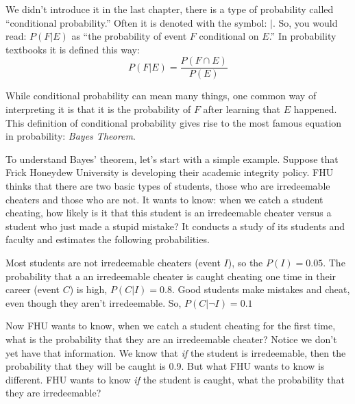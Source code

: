 We didn't introduce it in the last chapter,  there is a type of probability called ``conditional probability.''  Often it is denoted with the symbol: $|$.  So, you would read: $P(F | E)$ as ``the probability of event $F$ conditional on $E$.'' In probability textbooks it is defined this way:
\begin{equation}
    \label{e:conditional-prob}
    P(F | E) = \frac{P(F \cap E)}{P(E)}
\end{equation}


While conditional probability can mean many things, one common way of interpreting it is that it is the probability of $F$ after learning that $E$ happened.  This definition of conditional probability gives rise to the most famous equation in probability: {\it Bayes Theorem}. 

To understand Bayes' theorem, let's start with a simple example.  Suppose that Frick Honeydew University is developing their academic integrity policy.  FHU thinks that there are two basic types of students, those who are irredeemable cheaters and those who are not. It wants to know: when we catch a student cheating, how likely is it that this student is an irredeemable cheater versus a student who just made a stupid mistake?  It conducts a study of its students and faculty and estimates the following probabilities.

 Most students are not irredeemable cheaters (event $I$), so the $P(I) = 0.05$. The probability that a an irredeemable cheater is caught cheating one time in their career (event $C$) is high, $P(C|I) = 0.8$. Good students make mistakes and cheat, even though they aren't irredeemable.  So, $P(C|\neg I) = 0.1$


Now FHU wants to know, when we catch a student cheating for the first time, what is the probability that they are an irredeemable cheater?  Notice we don't yet have that information. We know that {\it if} the student is irredeemable, then the probability that they will be caught is 0.9.  But what FHU wants to know is different. FHU wants to know {\it if} the student is caught, what the probability that they are irredeemable?

